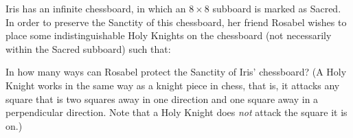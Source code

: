 Iris has an infinite chessboard, in which an $8\times 8$ subboard is marked as Sacred. In order to preserve the Sanctity of this chessboard, her friend Rosabel wishes to place some indistinguishable Holy Knights on the chessboard (not necessarily within the Sacred subboard) such that: 
\begin{itemize}
\end{itemize}
In how many ways can Rosabel protect the Sanctity of Iris' chessboard? (A Holy Knight works in the same way as a knight piece in chess, that is, it attacks any square that is two squares away in one direction and one square away in a perpendicular direction. Note that a Holy Knight does \emph{not} attack the square it is on.)
